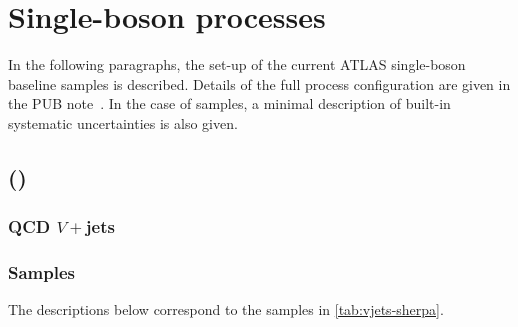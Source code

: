 
\chapter{Single-boson processes}

In the following paragraphs, the set-up of the current ATLAS single-boson baseline samples is described.
Details of the full process configuration are given in the PUB note~\cite{ATL-PHYS-PUB-2017-006}. In the case of \SHERPA samples,
a minimal description of built-in systematic uncertainties is also given.


\section[Sherpa MEPS@NLO]{\SHERPA (\MEPSatNLO)}

\subsection{QCD \(V+\)jets}

\subsection*{Samples}

The descriptions below correspond to the samples in \cref{tab:vjets-sherpa}.

